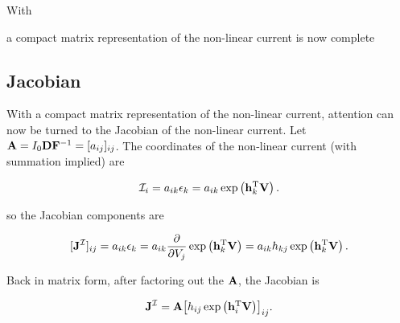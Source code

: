 \documentclass[12pt,journal,compsoc]{../ieeepaper/IEEEtran}
\begin{document}
With

a compact matrix representation of the non-linear current is now complete


\subsection{Jacobian}

With a compact matrix representation of the non-linear current, attention can now be turned to the Jacobian of the non-linear current.  Let \( \mathbf{A} = I_0 \mathbf{D} \mathbf{F}^{-1} = [ a_{ij} ]_{ij} \).  The coordinates of the non-linear current (with summation implied) are

\begin{dmath}\label{eqn:ece1254projectReport:1120}
\mathcal{I}_i = a_{ik} \epsilon_k = a_{ik} \exp\lr{ \Bh_k^\T \BV }.
\end{dmath}

so the Jacobian components are

\begin{dmath}\label{eqn:ece1254projectReport:1140}
[\BJ^{\mathcal{I}}]_{ij} 
= 
a_{ik} \epsilon_k = a_{ik} 
\PD{V_j}{}
\exp\lr{ \Bh_k^\T \BV }
= 
a_{ik} 
h_{kj}
\exp\lr{ \Bh_k^\T \BV }.
\end{dmath}

Back in matrix form, after factoring out the \( \mathbf{A} \), the Jacobian is

\begin{dmath}\label{eqn:ece1254projectReport:1140}
\BJ^{\mathcal{I}}
= 
\BA
{\begin{bmatrix}
h_{ij}
\exp\lr{ \Bh_i^\T \BV }
\end{bmatrix}}_{ij}.
\end{dmath}
\end{document}
